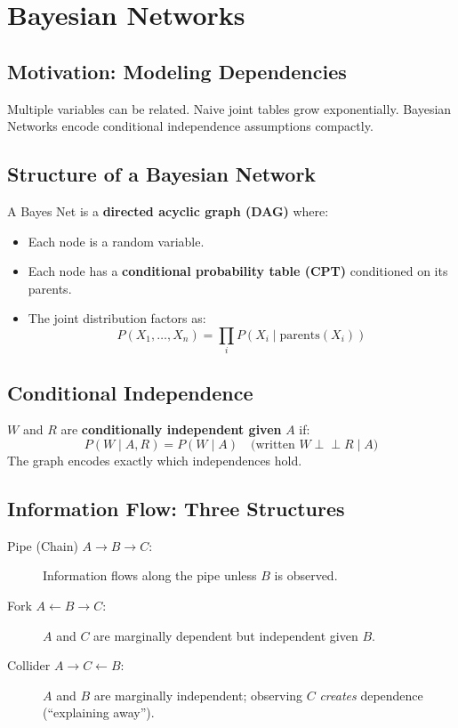 \documentclass[11pt]{article}
\begin{document}
\section{Bayesian Networks}

\subsection{Motivation: Modeling Dependencies}
Multiple variables can be related. Naive joint tables grow exponentially. Bayesian Networks encode conditional independence assumptions compactly.

\subsection{Structure of a Bayesian Network}
A Bayes Net is a \textbf{directed acyclic graph (DAG)} where:
\begin{itemize}
  \item Each node is a random variable.
  \item Each node has a \textbf{conditional probability table (CPT)} conditioned on its parents.
  \item The joint distribution factors as:
  \[
    P(X_1, \ldots, X_n) = \prod_{i} P(X_i \mid \text{parents}(X_i))
  \]
\end{itemize}

\subsection{Conditional Independence}
$W$ and $R$ are \textbf{conditionally independent given} $A$ if:
\[
  P(W \mid A, R) = P(W \mid A) \quad \text{(written } W \perp\!\!\!\perp R \mid A\text{)}
\]
The graph encodes exactly which independences hold.

\subsection{Information Flow: Three Structures}

\begin{description}
  \item[Pipe (Chain) $A \to B \to C$:] Information flows along the pipe unless $B$ is observed.
  \item[Fork $A \leftarrow B \rightarrow C$:] $A$ and $C$ are marginally dependent but independent given $B$.
  \item[Collider $A \rightarrow C \leftarrow B$:] $A$ and $B$ are marginally independent; observing $C$ \emph{creates} dependence (``explaining away'').
\end{description}
\end{document}
